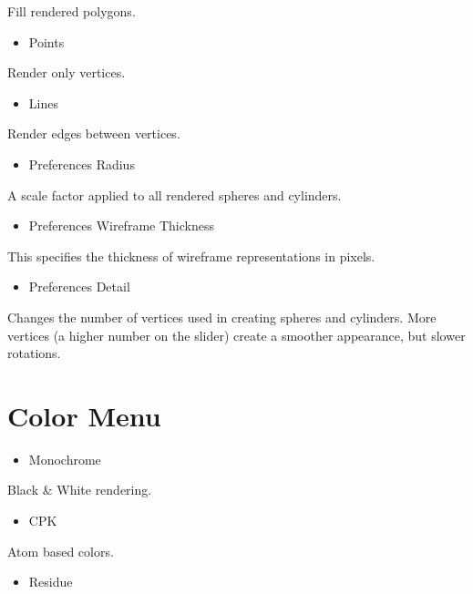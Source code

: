 \documentclass[letterpaper,11pt,english]{sphinxmanual}
\begin{document}
Fill rendered polygons.
\begin{itemize}
\item {} 
Points

\end{itemize}

Render only vertices.
\begin{itemize}
\item {} 
Lines

\end{itemize}

Render edges between vertices.
\begin{itemize}
\item {} 
Preferences \textendash{} Radius

\end{itemize}

A scale factor applied to all rendered spheres and cylinders.
\begin{itemize}
\item {} 
Preferences \textendash{} Wireframe Thickness

\end{itemize}

This specifies the thickness of wireframe representations in pixels.
\begin{itemize}
\item {} 
Preferences \textendash{} Detail

\end{itemize}

Changes the number of vertices used in creating spheres and cylinders. More vertices (a higher number on the slider) create a smoother appearance, but slower rotations.


\section{Color Menu}
\label{\detokenize{text/menus:color-menu}}\begin{itemize}
\item {} 
Monochrome

\end{itemize}

Black \& White rendering.
\begin{itemize}
\item {} 
CPK

\end{itemize}

Atom based colors.
\begin{itemize}
\item {} 
Residue

\end{itemize}
\end{document}
